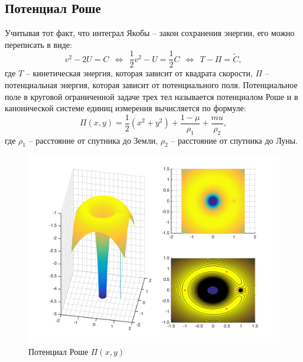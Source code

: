 \documentclass[a4paper,12pt]{article}
\begin{document}
\subsection{Потенциал Роше}
Учитывая тот факт, что интеграл Якобы -- закон сохранения энергии, его можно переписать в виде: \[ v^2 - 2U = C\ \ \Leftrightarrow\ \ \frac{1}{2}v^2 - U = \frac{1}{2}C\ \ \Leftrightarrow\ \ T-\Pi=\widetilde{C}, \] где $T$ -- кинетическая энергия, которая зависит от квадрата скорости, $\Pi$ -- потенциальная энергия, которая зависит от потенциального поля. Потенциальное поле в круговой ограниченной задаче трех тел называется потенциалом Роше и в канонической системе единиц измерения вычисляется по формуле: \[ \Pi(x,y) = \frac{1}{2}(x^2+y^2) +\frac{1-\mu}{\rho_1} + \frac{mu}{\rho_2}, \] где $\rho_1$ -- расстояние от спутника до Земли, $\rho_2$ -- расстояние от спутника до Луны.
\begin{figure}[h!]
	\centering
	\includegraphics[width=\textwidth]{../../img/rochePotential_3.png}
	\caption{Потенциал Роше $\Pi(x,y)$}
	\label{fig:RochePotential}
\end{figure}

\end{document}
